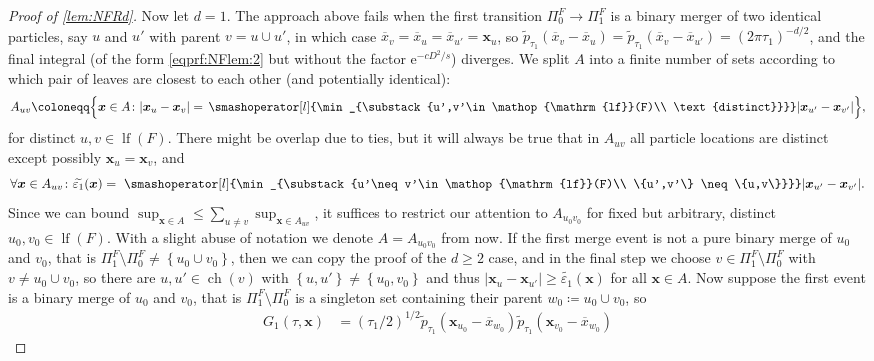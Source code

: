 \documentclass[reqno,draft]{amsart}
\numberwithin{equation}{section}
\theoremstyle{plain}
\theoremstyle{remark}
\newcommand{\e}{\mathrm{e}}
\DeclareMathOperator{\ch}{ch}
\newcommand{\fpart}{\Pi} %
\DeclareMathOperator{\lf}{lf}
\newcommand{\rfy}[1]{\widetilde{{#1}}} %
\newcommand{\interp}{\overline{x}} %
\begin{document}
\begin{proof}[Proof of \cref{lem:NFRd}]
    Now let $d = 1$. The approach above fails when the first transition $\fpart^F_0\to\fpart^F_1$ is a binary merger of two identical particles, say $u$ and $u'$ with parent $v = u\cup u'$, in which case $\interp_v = \interp_u = \interp_{u'} = \boldsymbol x_u$, so $\rfy{p}_{\tau_1}(\interp_v-\interp_u) = \rfy{p}_{\tau_1}(\interp_v-\interp_{u'}) = (2\pi \tau_1)^{-d / 2}$, and the final integral (of the form \cref{eqprf:NFlem:2} but without the factor $\e^{-cD^2 / s}$) diverges. We split $A$ into a finite number of sets according to which pair of leaves are closest to each other (and potentially identical): \[
        A_{uv} \coloneqq \Big\{ \boldsymbol x\in A\colon |\boldsymbol x_u-\boldsymbol x_v| = \,\smashoperator[l]{\min_{\substack{u',v'\in \lf(F)\\ \text{distinct}}}}|\boldsymbol x_{u'}-\boldsymbol x_{v'}| \Big\},
    \] for distinct $u,v\in\lf(F)$. There might be overlap due to ties, but it will always be true that in $A_{uv}$ all particle locations are distinct except possibly $\boldsymbol x_u = \boldsymbol x_v$, and \[
    \forall \boldsymbol x\in A_{uv}\colon \rfy{\varepsilon_1}(\boldsymbol x) = \,\, \smashoperator[l]{\min_{\substack{u'\neq v'\in \lf(F)\\ \{u',v'\} \neq \{u,v\}}}} |\boldsymbol x_{u'}-\boldsymbol x_{v'}|.
\] Since we can bound $\sup_{\boldsymbol x\in A} \le \sum_{u \neq v} \sup_{\boldsymbol x \in A_{uv}}$, it suffices to restrict our attention to $A_{u_0v_0}$ for fixed but arbitrary, distinct $u_0,v_0\in \lf(F)$. With a slight abuse of notation we denote $A = A_{u_0v_0}$ from now. If the first merge event is not a pure binary merge of $u_0$ and $v_0$, that is $\fpart^F_1\setminus \fpart^F_0 \neq \left\{ u_0\cup v_0 \right\} $, then we can copy the proof of the $d\ge 2$ case, and in the final step we choose $v\in \fpart^F_1\setminus \fpart^F_0$ with $v\neq u_0\cup v_0$, so there are $u,u'\in \ch(v)$ with $\left\{ u,u' \right\} \neq \left\{ u_0,v_0 \right\} $ and thus $|\boldsymbol x_u-\boldsymbol x_{u'}| \ge \rfy{\varepsilon_1}(\boldsymbol x)$ for all $\boldsymbol x\in A$. Now suppose the first event is a binary merge of $u_0$ and $v_0$, that is $\fpart^F_1\setminus \fpart^F_0$ is a singleton set containing their parent $w_0\coloneqq u_0\cup v_0$, so
    \begin{align}\label{eqprf:NFlem:5}
    G_1(\tau,\boldsymbol x)
     &= (\tau_1 / 2)^{1 / 2} \rfy{p}_{\tau_1}(\boldsymbol x_{u_0} - \interp_{w_0}) \rfy{p}_{\tau_1}(\boldsymbol x_{v_0}-\interp_{w_0})

\end{align}
\end{proof}
\end{document}
